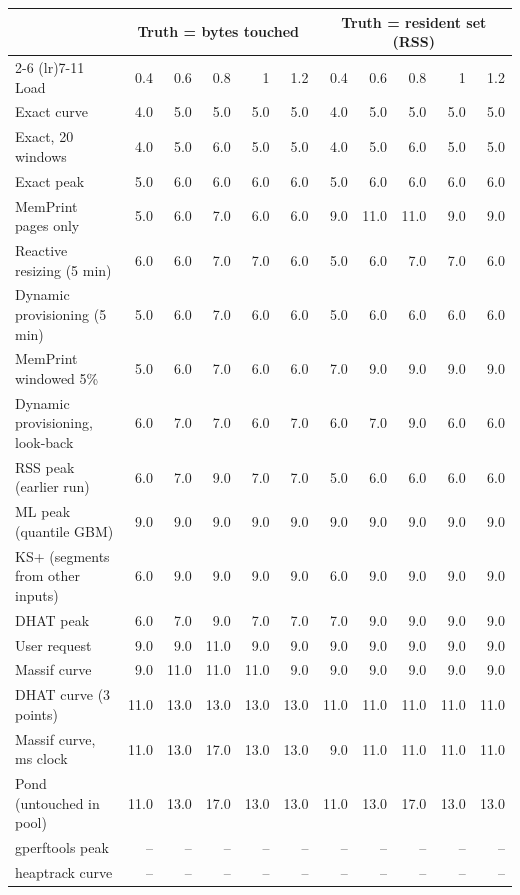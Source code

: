 \begin{tabular}{lrrrrrrrrrr}
\toprule
 & \multicolumn{5}{c}{Truth = bytes touched} & \multicolumn{5}{c}{Truth = resident set (RSS)} \\
\cmidrule(lr){2-6} \cmidrule(lr){7-11}
Load & 0.4 & 0.6 & 0.8 & 1 & 1.2 & 0.4 & 0.6 & 0.8 & 1 & 1.2 \\
\midrule
Exact curve & 4.0 & 5.0 & 5.0 & 5.0 & 5.0 & 4.0 & 5.0 & 5.0 & 5.0 & 5.0 \\
Exact, 20 windows & 4.0 & 5.0 & 6.0 & 5.0 & 5.0 & 4.0 & 5.0 & 6.0 & 5.0 & 5.0 \\
Exact peak & 5.0 & 6.0 & 6.0 & 6.0 & 6.0 & 5.0 & 6.0 & 6.0 & 6.0 & 6.0 \\
MemPrint pages only & 5.0 & 6.0 & 7.0 & 6.0 & 6.0 & 9.0 & 11.0 & 11.0 & 9.0 & 9.0 \\
Reactive resizing (5 min) & 6.0 & 6.0 & 7.0 & 7.0 & 6.0 & 5.0 & 6.0 & 7.0 & 7.0 & 6.0 \\
Dynamic provisioning (5 min) & 5.0 & 6.0 & 7.0 & 6.0 & 6.0 & 5.0 & 6.0 & 6.0 & 6.0 & 6.0 \\
MemPrint windowed 5\% & 5.0 & 6.0 & 7.0 & 6.0 & 6.0 & 7.0 & 9.0 & 9.0 & 9.0 & 9.0 \\
Dynamic provisioning, look-back & 6.0 & 7.0 & 7.0 & 6.0 & 7.0 & 6.0 & 7.0 & 9.0 & 6.0 & 6.0 \\
RSS peak (earlier run) & 6.0 & 7.0 & 9.0 & 7.0 & 7.0 & 5.0 & 6.0 & 6.0 & 6.0 & 6.0 \\
ML peak (quantile GBM) & 9.0 & 9.0 & 9.0 & 9.0 & 9.0 & 9.0 & 9.0 & 9.0 & 9.0 & 9.0 \\
KS+ (segments from other inputs) & 6.0 & 9.0 & 9.0 & 9.0 & 9.0 & 6.0 & 9.0 & 9.0 & 9.0 & 9.0 \\
DHAT peak & 6.0 & 7.0 & 9.0 & 7.0 & 7.0 & 7.0 & 9.0 & 9.0 & 9.0 & 9.0 \\
User request & 9.0 & 9.0 & 11.0 & 9.0 & 9.0 & 9.0 & 9.0 & 9.0 & 9.0 & 9.0 \\
Massif curve & 9.0 & 11.0 & 11.0 & 11.0 & 9.0 & 9.0 & 9.0 & 9.0 & 9.0 & 9.0 \\
DHAT curve (3 points) & 11.0 & 13.0 & 13.0 & 13.0 & 13.0 & 11.0 & 11.0 & 11.0 & 11.0 & 11.0 \\
Massif curve, ms clock & 11.0 & 13.0 & 17.0 & 13.0 & 13.0 & 9.0 & 11.0 & 11.0 & 11.0 & 11.0 \\
Pond (untouched in pool) & 11.0 & 13.0 & 17.0 & 13.0 & 13.0 & 11.0 & 13.0 & 17.0 & 13.0 & 13.0 \\
gperftools peak & -- & -- & -- & -- & -- & -- & -- & -- & -- & -- \\
heaptrack curve & -- & -- & -- & -- & -- & -- & -- & -- & -- & -- \\
\bottomrule
\end{tabular}

